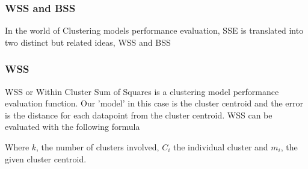 \documentclass[11pt]{article}
\begin{document}
		 	\subsubsection*{WSS and BSS}
		 		In the world of Clustering models performance evaluation, SSE is translated into two distinct but related ideas\cite{???}, WSS and BSS

		 		\subsubsection*{WSS}
		 			WSS or  Within Cluster Sum of Squares is a clustering model performance evaluation function. Our 'model' in this case is the cluster centroid and the error is the distance for each datapoint from the cluster centroid. WSS can be evaluated with the following formula\cite{???}

	 				Where $k$, the number of clusters involved, $C_i$ the individual cluster and $m_i$, the given cluster centroid.
\end{document}
